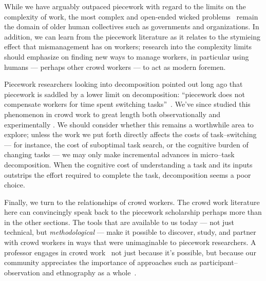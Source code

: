 \documentclass[trackingWork]{subfiles}
\begin{document}
While we have arguably outpaced piecework with regard to the limits on the complexity of work,
the most complex and open-ended wicked problems~\cite{rittel1973dilemmas} remain the domain of older human collectives such as governments and organizations. 
In addition, we can learn from the piecework literature as it relates to
the stymieing effect that mismanagement has on workers;
research into the complexity limits should emphasize on finding new ways to manage workers,
in particular using humans --- perhaps other crowd workers ---
to act as modern foremen.

Piecework researchers looking into decomposition pointed out long ago that
piecework is saddled by a lower limit on decomposition:
``piecework does not compensate workers for time spent switching tasks''~\cite{bewley1999wages}.
We've since studied this phenomenon in crowd work to great length both
observationally \cite{taskSearch} and
experimentally \cite{delayAndOrderLasecki}.
We should consider whether this remains a worthwhile area to explore; %
unless the work we put forth directly affects the costs of task--switching
--- for instance, the cost of suboptimal task search, or the cognitive burden of changing tasks ---
we may only make incremental advances in micro--task decomposition.
When the cognitive cost of understanding a task and its inputs outstrips the effort required to complete the task, decomposition seems a poor choice.

Finally, we turn to the relationships of crowd workers.
The crowd work literature here can convincingly speak back to
the piecework scholarship perhaps more than in the other sections.
The tools that are available to us today
--- not just technical, but \textit{methodological} ---
make it possible to
discover,
study, and
partner with 
crowd workers in ways that were unimaginable to piecework researchers.
A professor engages in crowd work~\cite{bighamHalfWorkday}
not just because it's possible, but because our community
appreciates the importance of approaches such as participant--observation and ethnography as a whole~\cite{olson2014ways}.
\end{document}
